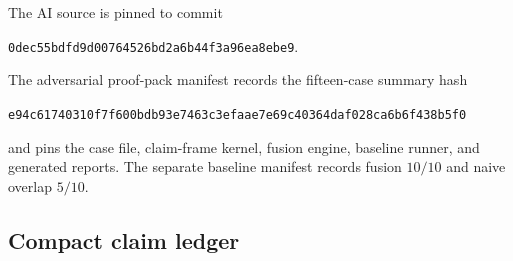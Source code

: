 The AI source is pinned to commit
\begin{center}
\nolinkurl{0dec55bdfd9d00764526bd2a6b44f3a96ea8ebe9}.
\end{center}
The adversarial proof-pack manifest records the fifteen-case summary hash
\begin{center}
\nolinkurl{e94c61740310f7f600bdb93e7463c3efaae7e69c40364daf028ca6b6f438b5f0}
\end{center}
and pins the case file, claim-frame kernel, fusion engine, baseline runner, and generated reports. The separate baseline manifest records fusion $10/10$ and naive overlap $5/10$.

\subsection{Compact claim ledger}

